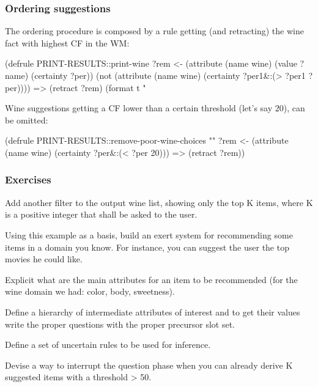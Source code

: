 \documentclass[xcolor={usenames,dvipsnames,svgnames}, compress]{beamer}
\begin{document}
\begin{frame}[fragile]
  \frametitle{Ordering suggestions}
  The ordering procedure is composed by a rule getting (and
  retracting) the wine fact with highest CF in the WM:
  \begin{clips-code}[numbers=none]
    (defrule PRINT-RESULTS::print-wine 
        ?rem <- (attribute (name wine) (value ?name) (certainty ?per))                
        (not (attribute (name wine) (certainty ?per1&:(> ?per1 ?per))))
        =>
        (retract ?rem)
        (format t " %
  \end{clips-code}

  Wine suggestions getting a CF lower than a certain threshold (let's
  say $20$), can be omitted:
  \begin{clips-code}[numbers=none]
    (defrule PRINT-RESULTS::remove-poor-wine-choices ""
        ?rem <- (attribute (name wine) (certainty ?per&:(< ?per 20)))
        =>
        (retract ?rem))
  \end{clips-code}
\end{frame}

\begin{frame}
  \frametitle{Exercises}

  Add another filter to the output wine list, showing only the top K
  items, where K is a positive integer that shall be asked to the user.
  \par\bigskip
  
  Using this example as a basis, build an exert system for
  recommending some items in a domain you know. For instance, you can
  suggest the user the top movies he could like.\par
  Explicit what are the main attributes for an item to be recommended
  (for the wine domain we had: color, body, sweetness).\par
  Define a hierarchy of intermediate attributes of interest and to get their
  values write the proper questions with the proper \textsf{precursor}
  slot set.\par
  Define a set of uncertain rules to be used for inference.\par\bigskip

  Devise a way to interrupt the question phase when you can already derive
  K suggested items with a threshold > 50.
\end{frame}
\end{document}
